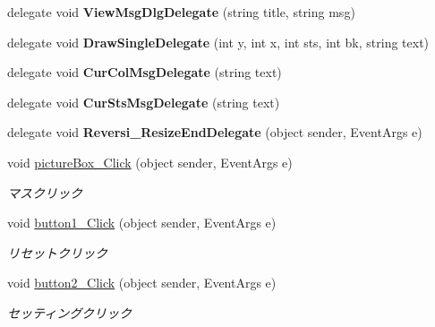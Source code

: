 \begin{DoxyCompactItemize}
\item 
\mbox{\label{class_reversi_form_1_1_reversi_adddf0cf721d71873165e82f67f5d09d8}} 
delegate void {\bfseries View\+Msg\+Dlg\+Delegate} (string title, string msg)
\item 
\mbox{\label{class_reversi_form_1_1_reversi_a065c6275be5c52e90bdad6fbe8d68362}} 
delegate void {\bfseries Draw\+Single\+Delegate} (int y, int x, int sts, int bk, string text)
\item 
\mbox{\label{class_reversi_form_1_1_reversi_abc5c0d998390dc9e9052e514c3824ef6}} 
delegate void {\bfseries Cur\+Col\+Msg\+Delegate} (string text)
\item 
\mbox{\label{class_reversi_form_1_1_reversi_a2ed28729afe13d992636e461964e5cd7}} 
delegate void {\bfseries Cur\+Sts\+Msg\+Delegate} (string text)
\item 
\mbox{\label{class_reversi_form_1_1_reversi_a7a4458a4ad3aded3ae17bfe930a122c3}} 
delegate void {\bfseries Reversi\+\_\+\+Resize\+End\+Delegate} (object sender, Event\+Args e)
\item 
void \hyperlink{class_reversi_form_1_1_reversi_afaa2a98428f4d9eab723fb71f8cb3e29}{picture\+Box\+\_\+\+Click} (object sender, Event\+Args e)
\begin{DoxyCompactList}\small\item\em マスクリック \end{DoxyCompactList}\item 
void \hyperlink{class_reversi_form_1_1_reversi_a832e3ee4b606141b3feefb47742b3849}{button1\+\_\+\+Click} (object sender, Event\+Args e)
\begin{DoxyCompactList}\small\item\em リセットクリック \end{DoxyCompactList}\item 
void \hyperlink{class_reversi_form_1_1_reversi_aa908556d4f216f8b407c1458e392dfc5}{button2\+\_\+\+Click} (object sender, Event\+Args e)
\begin{DoxyCompactList}\small\item\em セッティングクリック \end{DoxyCompactList}\item 

\end{DoxyCompactItemize}
